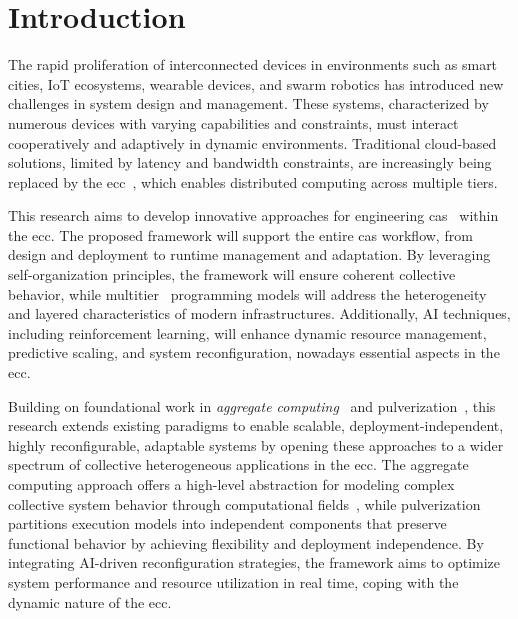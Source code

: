 \documentclass[runningheads]{llncs}
\begin{document}
\section{Introduction}
\label{sec:introduction}
The rapid proliferation of interconnected devices in environments such as smart cities,
IoT ecosystems,
wearable devices,
and swarm robotics has introduced new challenges in system design and management.
%
These systems,
characterized by numerous devices with varying capabilities and constraints,
must interact cooperatively and adaptively in dynamic environments.
%
Traditional cloud-based solutions,
limited by latency and bandwidth constraints,
are increasingly being replaced by the \ac{ecc}~\cite{DBLP:journals/access/MoreschiniPLNHT22},
which enables distributed computing across multiple tiers.

This research aims to develop innovative approaches for engineering \ac{cas}~\cite{DBLP:conf/birthday/BucchiaroneM19} within the \ac{ecc}.
%
The proposed framework will support the entire \ac{cas} workflow,
from design and deployment to runtime management and adaptation.
%
By leveraging self-organization principles,
the framework will ensure coherent collective behavior,
while multitier~\cite{DBLP:journals/csur/WeisenburgerWS20} programming models will address the heterogeneity and layered characteristics of modern infrastructures.
%
Additionally,
AI techniques,
including reinforcement learning,
will enhance dynamic resource management,
predictive scaling,
and system reconfiguration,
nowadays essential aspects in the \ac{ecc}.

Building on foundational work in \emph{aggregate computing}~\cite{DBLP:journals/computer/BealPV15} and pulverization~\cite{DBLP:journals/fi/CasadeiPPVW20,DBLP:journals/iotj/CasadeiFPPSV22},
this research extends existing paradigms to enable scalable,
deployment-independent,
highly reconfigurable,
adaptable systems by opening these approaches to a wider spectrum of collective heterogeneous applications in the \ac{ecc}.
%
The aggregate computing approach offers a high-level abstraction for modeling complex collective system behavior through computational fields~\cite{DBLP:journals/tocl/AudritoVDPB19},
while pulverization partitions execution models into independent components that preserve functional behavior by achieving flexibility and deployment independence.
%
By integrating AI-driven reconfiguration strategies,
the framework aims to optimize system performance and resource utilization in real time,
coping with the dynamic nature of the \ac{ecc}.
\end{document}
